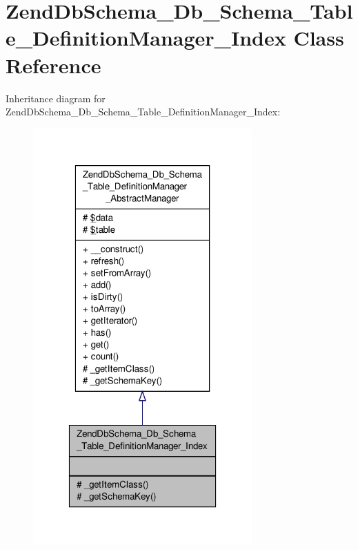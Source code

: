 \hypertarget{classZendDbSchema__Db__Schema__Table__DefinitionManager__Index}{\section{Zend\-Db\-Schema\-\_\-\-Db\-\_\-\-Schema\-\_\-\-Table\-\_\-\-Definition\-Manager\-\_\-\-Index Class Reference}
\label{classZendDbSchema__Db__Schema__Table__DefinitionManager__Index}
}


Inheritance diagram for Zend\-Db\-Schema\-\_\-\-Db\-\_\-\-Schema\-\_\-\-Table\-\_\-\-Definition\-Manager\-\_\-\-Index\-:\nopagebreak
\begin{figure}[H]
\begin{center}
\leavevmode
\includegraphics[width=238pt]{classZendDbSchema__Db__Schema__Table__DefinitionManager__Index__inherit__graph}
\end{center}
\end{figure}


